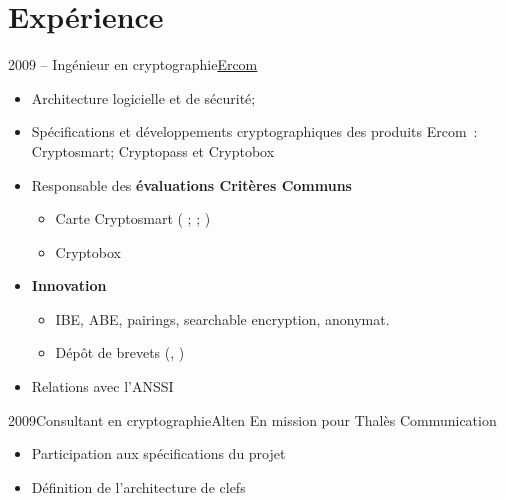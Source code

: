 \documentclass[french, a4paper]{customcv}
\begin{document}
\makeprofile
\section{Expérience}

\begin{cventry}{2009 -- }{Ingénieur en cryptographie}{\href{https://www.ercom.fr/}{Ercom}}
  \begin{itemize}
    \item  Architecture logicielle et de sécurité;
    \item Spécifications et développements cryptographiques des produits Ercom~:\linebreak
          Cryptosmart; Cryptopass et Cryptobox
    \item Responsable des \textbf{évaluations Critères Communs}
          \begin{itemize}
            \item Carte Cryptosmart (\cite{anssi.2012/71} ; \cite{anssi.2016/69}; \cite{anssi.2019/38})
            \item Cryptobox \cite{anssi.2018/23}
          \end{itemize}
    \item \textbf{Innovation}
          \begin{itemize}
            \item IBE, ABE, pairings, searchable encryption, anonymat.
            \item Dépôt de brevets (\cite{pat.save}, \cite{pat.card.auth})
          \end{itemize}
    \item Relations avec l'ANSSI
  \end{itemize}
\end{cventry}

\begin{cventry}{2009}{Consultant en cryptographie}{Alten}
  En mission pour Thalès Communication
  \begin{itemize}
    \item Participation aux spécifications du projet
    \item Définition de l'architecture de clefs
  \end{itemize}
\end{cventry}
\end{document}
